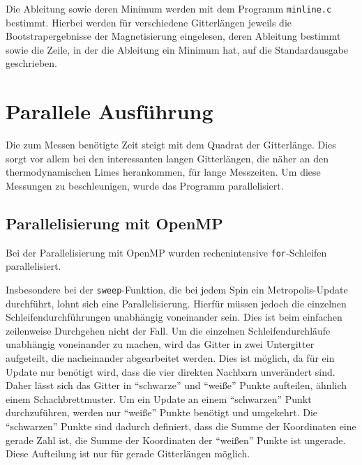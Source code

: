 	Die Ableitung sowie deren Minimum werden mit dem Programm \texttt{minline.c} bestimmt. Hierbei werden für verschiedene Gitterlängen jeweils die Bootstrapergebnisse der Magnetisierung eingelesen, deren Ableitung bestimmt sowie die Zeile, in der die Ableitung ein Minimum hat, auf die Standardausgabe geschrieben.
		
	
	\section{Parallele Ausführung}
	\label{sec:parallelimplementierung}


	
	Die zum Messen benötigte Zeit steigt mit dem Quadrat der Gitterlänge. Dies sorgt vor allem bei den interessanten langen Gitterlängen, die näher an den thermodynamischen Limes herankommen, für lange Messzeiten. Um diese Messungen zu beschleunigen, wurde das Programm parallelisiert.
	
	\subsection{Parallelisierung mit OpenMP}
	\label{subsec:paropenmp}
	Bei der Parallelisierung mit OpenMP wurden rechenintensive \texttt{for}-Schleifen parallelisiert.
	
%	
%		
%	
	Insbesondere bei der \texttt{sweep}-Funktion, die bei jedem Spin ein Metropolis-Update durchführt, lohnt sich eine Parallelisierung. Hierfür müssen jedoch die einzelnen Schleifendurchführungen unabhängig voneinander sein. Dies ist beim einfachen zeilenweise Durchgehen nicht der Fall. 
	Um die einzelnen Schleifendurchläufe unabhängig voneinander zu machen, wird das Gitter in zwei Untergitter aufgeteilt, die nacheinander abgearbeitet werden. Dies ist möglich, da für ein Update nur benötigt wird, dass die vier direkten Nachbarn unverändert sind. Daher lässt sich das Gitter in \enquote{schwarze}
	und \enquote{weiße} Punkte aufteilen, ähnlich einem Schachbrettmuster. %
	Um ein Update an einem \enquote{schwarzen} Punkt durchzuführen, werden nur \enquote{weiße} Punkte benötigt und umgekehrt. Die \enquote{schwarzen} Punkte sind dadurch definiert, dass die Summe der Koordinaten eine gerade Zahl ist, die Summe der Koordinaten der \enquote{weißen} Punkte ist ungerade. Diese Aufteilung ist nur für gerade Gitterlängen möglich.
	
